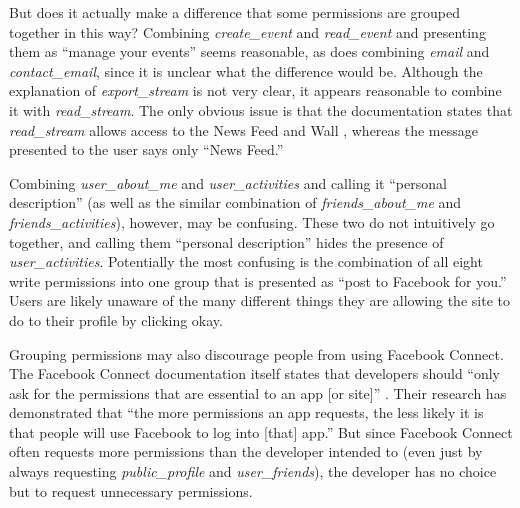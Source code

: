\documentclass[10pt]{sig-alternate-10pt}
\begin{document}
But does it actually make a difference that some permissions are grouped together in this way? Combining \emph{create\_event} and \emph{read\_event} and presenting them as ``manage your events'' seems reasonable, as does combining \emph{email} and \emph{contact\_email}, since it is unclear what the difference would be. Although the explanation of \emph{export\_stream} is not very clear, it appears reasonable to combine it with \emph{read\_stream}. The only obvious issue is that the documentation states that \emph{read\_stream} allows access to the News Feed and Wall \cite{fbpermissions}, whereas the message presented to the user says only ``News Feed.''

Combining \emph{user\_about\_me} and \emph{user\_activities} and calling it ``personal description'' (as well as the similar combination of \emph{friends\_about\_me} and \emph{friends\_activities}), however, may be confusing. These two do not intuitively go together, and calling them ``personal description'' hides the presence of \emph{user\_activities}. Potentially the most confusing is the combination of all eight write permissions into one group that is presented as ``post to Facebook for you.'' Users are likely unaware of the many different things they are allowing the site to do to their profile by clicking okay. 


Grouping permissions may also discourage people from using Facebook Connect. The Facebook Connect documentation itself states that developers should ``only ask for the permissions that are essential to an app [or site]'' \cite{fbpermsinstructions}. Their research has demonstrated that ``the more permissions an app requests, the less likely it is that people will use Facebook to log into [that] app.'' But since Facebook Connect often requests more permissions than the developer intended to (even just by always requesting \emph{public\_profile} and \emph{user\_friends}), the developer has no choice but to request unnecessary permissions. %
\end{document}
